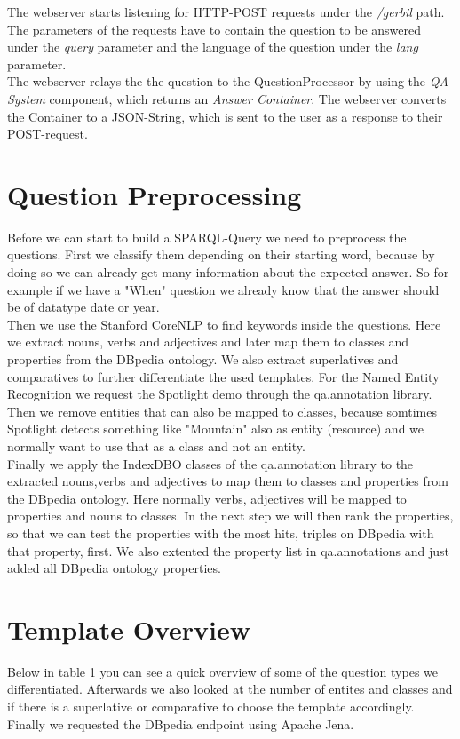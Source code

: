 \documentclass[runningheads]{llncs}
\begin{document}
The webserver starts listening for HTTP-POST requests under the \emph{/gerbil} path. The parameters of the requests have to contain the question to be answered under the \emph{query} parameter and the language of the question under the \emph{lang} parameter. \\

The webserver relays the the question to the QuestionProcessor by using the \emph{QA-System} component, which returns an \emph{Answer Container}. The webserver converts the Container to a JSON-String, which is sent to the user as a response to their POST-request.

\section{Question Preprocessing} 
Before we can start to build a SPARQL-Query we need to preprocess the questions. First we classify them depending on their starting word, because by doing so we can already get many information about the expected answer. So for example if we have a "When" question we already know that the answer should be of datatype date or year. \\

Then we use the Stanford CoreNLP to find keywords inside the questions. Here we extract nouns, verbs and adjectives and later map them to classes and properties from the DBpedia ontology. We also extract superlatives and comparatives to further differentiate the used templates. For the Named Entity Recognition we request the Spotlight \cite{spotlight} demo through the qa.annotation library. Then we remove entities that can also be mapped to classes, because somtimes Spotlight detects something like "Mountain" also as entity (resource) and we normally want to use that as a class and not an entity. \\

Finally we apply the IndexDBO classes of the qa.annotation library to the extracted nouns,verbs and adjectives to map them to classes and properties from the DBpedia ontology. Here normally verbs, adjectives will be mapped
to properties and nouns to classes. In the next step we will then rank the properties, so that we can test the properties with the most hits, triples on DBpedia with that property, first. We also extented the property list in qa.annotations and just added all DBpedia ontology properties.

\section{Template Overview}
Below in table 1 you can see a quick overview of some of the question types we differentiated. Afterwards we also looked at the number of entites and classes and if there is a superlative or comparative to choose the template accordingly. Finally we requested the DBpedia endpoint using Apache Jena.
\end{document}
